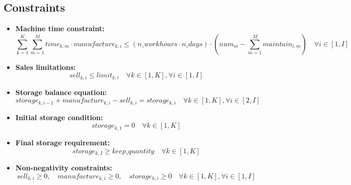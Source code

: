 \documentclass{article}
\begin{document}
\subsection*{Constraints}

\begin{itemize}
    \item \textbf{Machine time constraint:}
    \[
    \sum_{k=1}^{K} \sum_{m=1}^{M} time_{k, m} \cdot manufacture_{k, i} \leq (n\_workhours \cdot n\_days) \cdot (num_{m} - \sum_{m=1}^{M} maintain_{i, m}) \quad \forall i \in [1, I]
    \]
    
    \item \textbf{Sales limitations:}
    \[
    sell_{k, i} \leq limit_{k, i} \quad \forall k \in [1, K], \forall i \in [1, I]
    \]

    \item \textbf{Storage balance equation:}
    \[
    storage_{k, i-1} + manufacture_{k, i} - sell_{k, i} = storage_{k, i} \quad \forall k \in [1, K], \forall i \in [2, I]
    \]
    
    \item \textbf{Initial storage condition:}
    \[
    storage_{k, 1} = 0 \quad \forall k \in [1, K]
    \]
    
    \item \textbf{Final storage requirement:}
    \[
    storage_{k, I} \geq keep\_quantity \quad \forall k \in [1, K]
    \]
    
    \item \textbf{Non-negativity constraints:}
    \[
    sell_{k, i} \geq 0, \quad manufacture_{k, i} \geq 0, \quad storage_{k, i} \geq 0 \quad \forall k \in [1, K], \forall i \in [1, I]
    \]
\end{itemize}
\end{document}
